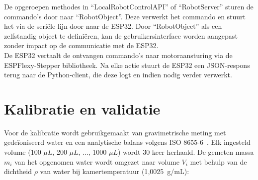 De opgeroepen methodes in ``LocalRobotControlAPI'' of ``RobotServer'' sturen de commando's door naar ``RobotObject''. Deze verwerkt het commando en stuurt het via de seriële lijn door naar de ESP32. Door ``RobotObject'' als een zelfstandig object te definiëren, kan de gebruikersinterface worden aangepast zonder impact op de communicatie met de ESP32.
\\[12pt]De ESP32 vertaalt de ontvangen commando’s naar motoraansturing via de ESPFlexy-Stepper bibliotheek. Na elke actie stuurt de ESP32 een JSON-respons terug naar de Python-client, die deze logt en indien nodig verder verwerkt.

\section{Kalibratie en validatie}
Voor de kalibratie wordt gebruikgemaakt van gravimetrische meting met gedeïoniseerd water en een analytische balans volgens ISO 8655-6\ \cite{RN50}.
Elk ingesteld volume (100 $\mu L$, 200 $\mu L$, ..., 1000 $\mu L$) wordt 30 keer herhaald. De gemeten massa $m_i$
van het opgenomen water wordt omgezet naar volume $V_i$ met behulp van de dichtheid $\rho$ van water bij kamertemperatuur (1{,}0025~g/mL):

